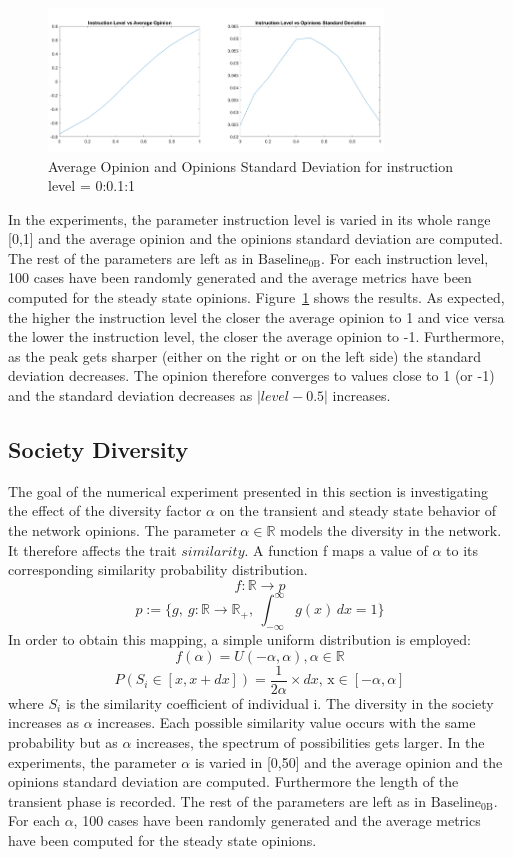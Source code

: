 \begin{figure}[!t]
	\centering
	\includegraphics[width=3.5in]{Figures/instruction_results.png}
	\caption{Average Opinion and Opinions Standard Deviation for instruction level = 0:0.1:1}
	\label{pics:critstatistics}
\end{figure}
In the experiments, the parameter instruction level is varied in its whole range [0,1] and the average opinion and the opinions standard deviation are computed. The rest of the parameters are left as in $\text{Baseline}_\text{0B}$. For each instruction level, 100 cases have been randomly generated and the average metrics have been computed for the steady state opinions.
Figure~\ref{pics:critstatistics} shows the results. As expected, the higher the instruction level the closer the average opinion to 1 and vice versa the lower the instruction level, the closer the average opinion to -1. Furthermore, as the peak gets sharper (either on the right or on the left side) the standard deviation decreases. The opinion therefore converges to values close to 1 (or -1) and the standard deviation decreases as $|level-0.5|$ increases. 
\subsection{Society Diversity}
\label{sec:diversity}
The goal of the numerical experiment presented in this section is investigating the effect of the diversity factor $\alpha$ on the transient and steady state behavior of the network opinions. The parameter $\alpha \in \mathbb{R}$ models the diversity in the network. It therefore affects the trait $similarity$.
A function f maps a value of $\alpha$ to its corresponding similarity probability distribution. 
$$
f: \mathbb{R} \to p 
$$
$$
p:= \{g,\ g: \mathbb{R} \to \mathbb{R}_+,\ \int_{-\infty}^{\infty} g(x) \,dx = 1\}
$$
In order to obtain this mapping, a simple uniform distribution is employed:
$$
f(\alpha) = U(-\alpha, \alpha), \alpha \in \mathbb{R}
$$
$$
P(S_i\in[x,x+dx]) =  \frac{1}{2\alpha} \times dx\text{, x}\in [-\alpha, \alpha]
$$
where $S_i$ is the similarity coefficient of individual i.
The diversity in the society increases as $\alpha$ increases. Each possible similarity value occurs with the same probability but as $\alpha$ increases, the spectrum of possibilities gets larger. \newline
In the experiments, the parameter $\alpha$ is varied in [0,50] and the average opinion and the opinions standard deviation are computed. Furthermore the length of the transient phase is recorded. The rest of the parameters are left as in $\text{Baseline}_\text{0B}$. For each $\alpha$, 100 cases have been randomly generated and the average metrics have been computed for the steady state opinions. 

